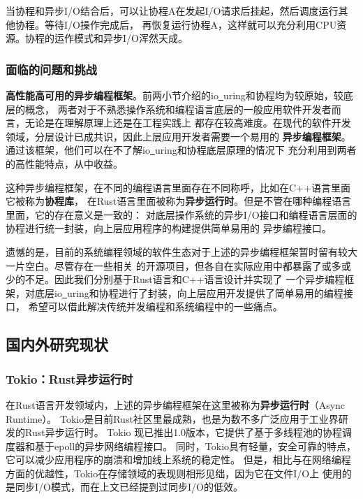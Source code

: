 \documentclass[supercite]{HustGraduPaper}
\theoremstyle{definition}
\begin{document}
当协程和异步I/O结合后，可以让协程A在发起I/O请求后挂起，然后调度运行其他协程。等待I/O操作完成后，
再恢复运行协程A，这样就可以充分利用CPU资源。协程的运作模式和异步I/O浑然天成。\par

\subsubsection{面临的问题和挑战}
\textbf{高性能高可用的异步编程框架}。前两小节介绍的io\underline{~}uring和协程均为较原始，较底层的概念，
两者对于不熟悉操作系统和编程语言底层的一般应用软件开发者而言，无论是在理解原理上还是在工程实践上
都存在较高难度。在现代的软件开发领域，分层设计已成共识，因此上层应用开发者需要一个易用的
\textbf{异步编程框架}。通过该框架，他们可以在不了解io\underline{~}uring和协程底层原理的情况下
充分利用到两者的高性能特点，从中收益。\par

这种异步编程框架，在不同的编程语言里面存在不同称呼，比如在C++语言里面它被称为\textbf{协程库}，
在Rust语言里面被称为\textbf{异步运行时}。但是不管在哪种编程语言里面，它的存在意义是一致的：
对底层操作系统的异步I/O接口和编程语言层面的协程进行统一封装，向上层应用程序的构建提供简单易用的
异步编程接口。\par

遗憾的是，目前的系统编程领域的软件生态对于上述的异步编程框架暂时留有较大一片空白。尽管存在一些相关
的开源项目，但各自在实际应用中都暴露了或多或少的不足。因此我们分别基于Rust语言和C++语言设计并实现了
一个异步编程框架，对底层io\underline{~}uring和协程进行了封装，向上层应用开发提供了简单易用的编程接口，
希望可以借此解决传统并发编程和系统编程中的一些痛点。\par

\subsection{国内外研究现状}

\subsubsection{Tokio：Rust异步运行时}
在Rust语言开发领域内，上述的异步编程框架在这里被称为\textbf{异步运行时}（Async Runtime）。
Tokio是目前Rust社区里最成熟，也是为数不多广泛应用于工业界研发的Rust异步运行时。
Tokio 现已推出1.0版本，它提供了基于多线程池的协程调度器和基于epoll的异步网络编程接口。
同时，Tokio具有轻量，安全可靠的特点，它可以减少应用程序的崩溃和增加线上系统的稳定性。
但是，相比与在网络编程方面的优越性，Tokio在存储领域的表现则相形见绌，因为它在文件I/O上
使用的是同步I/O模式，而在上文已经提到过同步I/O的低效。\par
\end{document}
